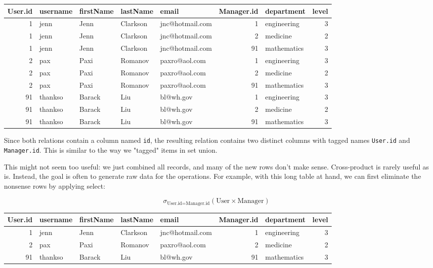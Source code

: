 \documentclass[a4paper, justified, notitlepage, sfsidenotes, notoc]{tufte-book}
\begin{document}
\begin{enumerate}
\begin{center}
\begin{tabular}{rllllrlr}
User.id & username & firstName & lastName & email & Manager.id & department & level\\
\hline
1 & jenn & Jenn & Clarkson & jnc@hotmail.com & 1 & engineering & 3\\
1 & jenn & Jenn & Clarkson & jnc@hotmail.com & 2 & medicine & 2\\
1 & jenn & Jenn & Clarkson & jnc@hotmail.com & 91 & mathematics & 3\\
2 & pax & Paxi & Romanov & paxro@aol.com & 1 & engineering & 3\\
2 & pax & Paxi & Romanov & paxro@aol.com & 2 & medicine & 2\\
2 & pax & Paxi & Romanov & paxro@aol.com & 91 & mathematics & 3\\
91 & thankso & Barack & Liu & bl@wh.gov & 1 & engineering & 3\\
91 & thankso & Barack & Liu & bl@wh.gov & 2 & medicine & 2\\
91 & thankso & Barack & Liu & bl@wh.gov & 91 & mathematics & 3\\
\end{tabular}
\end{center}

Since both relations contain a column named \texttt{id}, the resulting relation contains two distinct columns with tagged names \texttt{User.id} and \texttt{Manager.id}. This is similar to the way we "tagged" items in set union.

This might not seem too useful: we just combined all records, and many of the new rows don't make sense. Cross-product is rarely useful as is. Instead, the goal is often to generate raw data for the operations. For example, with this long table at hand, we can first eliminate the nonsense rows by applying select:

\begin{equation}
\sigma_{\textrm{User.id} = \textrm{Manager.id}} (\textrm{User} \times \textrm{Manager})
\end{equation}


\begin{center}
\begin{tabular}{rllllrlr}
User.id & username & firstName & lastName & email & Manager.id & department & level\\
\hline
1 & jenn & Jenn & Clarkson & jnc@hotmail.com & 1 & engineering & 3\\
2 & pax & Paxi & Romanov & paxro@aol.com & 2 & medicine & 2\\
91 & thankso & Barack & Liu & bl@wh.gov & 91 & mathematics & 3\\
\end{tabular}
\end{center}


\end{enumerate}
\end{document}
